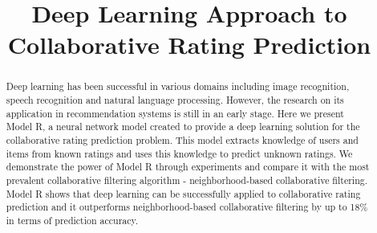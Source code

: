 \documentclass[sigconf]{acmart}
\title{Deep Learning Approach to Collaborative Rating Prediction}
\begin{document}
\maketitle

\begin{abstract}
	Deep learning has been successful in various domains 
	including image recognition, speech recognition and natural language 
	processing.
	However, the research on its application in recommendation systems is 
	still in an early stage.
	Here we present Model R, a neural network model created to provide a deep 
	learning solution for the collaborative rating prediction problem.
	This model extracts knowledge of users and items from known ratings and 
	uses this knowledge to predict unknown ratings.
	We demonstrate the power of Model R through experiments and compare it with 
	the most prevalent collaborative filtering algorithm - neighborhood-based 
	collaborative filtering.
	Model R shows that deep learning can be successfully applied to 
	collaborative rating prediction and it outperforms neighborhood-based 
	collaborative filtering by up to 18\% in terms of prediction accuracy.
\end{abstract}
\end{document}
